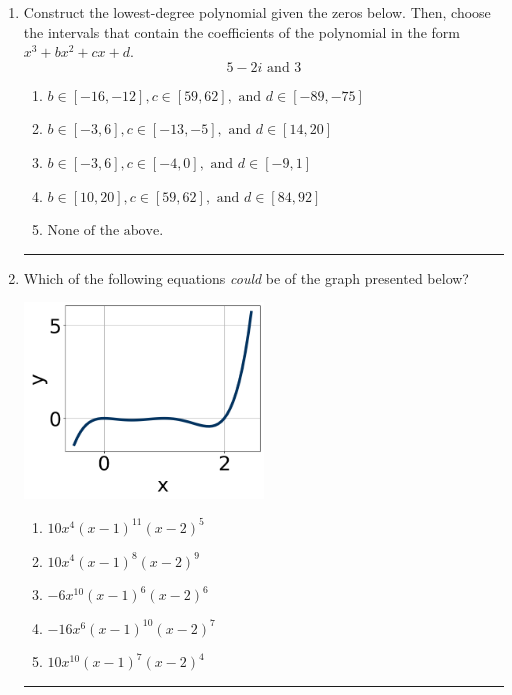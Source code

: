 \documentclass[14pt]{extbook}
\newcommand{\litem}[1]{\item#1\hspace*{-1cm}\rule{\textwidth}{0.4pt}}
\begin{document}
\begin{enumerate}
\litem{
Construct the lowest-degree polynomial given the zeros below. Then, choose the intervals that contain the coefficients of the polynomial in the form $x^3+bx^2+cx+d$.\[ 5 - 2 i \text{ and } 3 \]\begin{enumerate}[label=\Alph*.]
\item \( b \in [-16, -12], c \in [59, 62], \text{ and } d \in [-89, -75] \)
\item \( b \in [-3, 6], c \in [-13, -5], \text{ and } d \in [14, 20] \)
\item \( b \in [-3, 6], c \in [-4, 0], \text{ and } d \in [-9, 1] \)
\item \( b \in [10, 20], c \in [59, 62], \text{ and } d \in [84, 92] \)
\item \( \text{None of the above.} \)

\end{enumerate} }
\litem{
Which of the following equations \textit{could} be of the graph presented below?
\begin{center}
    \includegraphics[width=0.5\textwidth]{../Figures/polyGraphToFunctionCopyC.png}
\end{center}
\begin{enumerate}[label=\Alph*.]
\item \( 10x^{4} (x - 1)^{11} (x - 2)^{5} \)
\item \( 10x^{4} (x - 1)^{8} (x - 2)^{9} \)
\item \( -6x^{10} (x - 1)^{6} (x - 2)^{6} \)
\item \( -16x^{6} (x - 1)^{10} (x - 2)^{7} \)
\item \( 10x^{10} (x - 1)^{7} (x - 2)^{4} \)


\end{enumerate}}
\end{enumerate}
\end{document}
